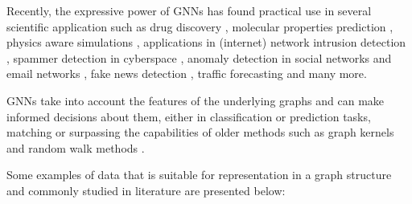 Recently, the expressive power of GNNs has found practical use in
several scientific application such as drug discovery
\cite{article:xiong,article:bognini}, molecular properties prediction
\cite{article:wieder}, physics aware simulations \cite{article:sanchez},
applications in (internet) network intrusion detection \cite{article:weng},
spammer detection in cyberspace \cite{article:zhiwei}, anomaly
detection in social networks and email networks \cite{article:chaudhary},
fake news detection \cite{article:monti}, traffic forecasting \cite{article:jiang}
and many more. 

GNNs take into account the features of the underlying graphs
and can make informed decisions about them, either in classification
or prediction tasks, matching or surpassing the capabilities of older methods
such as graph kernels and random walk methods \cite{xu2018powerful}.

Some examples of data that is suitable for representation in
a graph structure and commonly studied in literature are presented
below:

